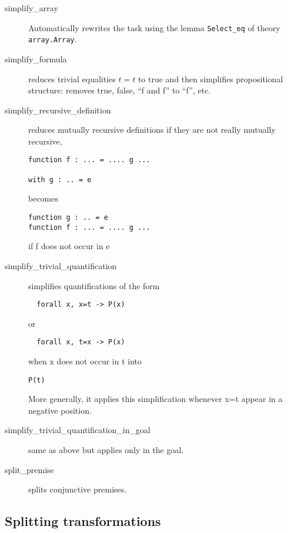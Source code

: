 \begin{description}

\item[simplify\_array] Automatically rewrites the task using the lemma
  \verb|Select_eq| of theory \verb|array.Array|.

\item[simplify\_formula] reduces trivial equalities $t=t$ to true and
  then simplifies propositional structure: removes true, false, ``f
  and f'' to ``f'', etc.

\item[simplify\_recursive\_definition] reduces mutually recursive
  definitions if they are not really mutually recursive, \eg
\begin{verbatim}
function f : ... = .... g ...

with g : .. = e
\end{verbatim}
becomes
\begin{verbatim}
function g : .. = e
function f : ... = .... g ...
\end{verbatim}
if f does not occur in e

\item[simplify\_trivial\_quantification]
  simplifies quantifications of the form
\begin{verbatim}
  forall x, x=t -> P(x)
\end{verbatim}
or
\begin{verbatim}
  forall x, t=x -> P(x)
\end{verbatim}
  when x does not occur in t
  into
\begin{verbatim}
P(t)
\end{verbatim}
  More generally, it applies this simplification whenever x=t appear
  in a negative position.

\item[simplify\_trivial\_quantification\_in\_goal]
  same as above but applies only in the goal.

\item[split\_premise]
  splits conjunctive premises.

\end{description}

\subsection{Splitting transformations}

